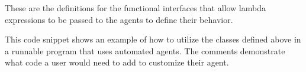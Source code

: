  
 
 These are the definitions for the functional interfaces that allow lambda expressions to be passed to the agents to define their behavior.
 
 
 
  This code snippet shows an example of how to utilize the classes defined above in a runnable program that uses automated agents. The comments demonstrate what code a user would need to add to customize their agent.\\ 	
 
 
 

 	






